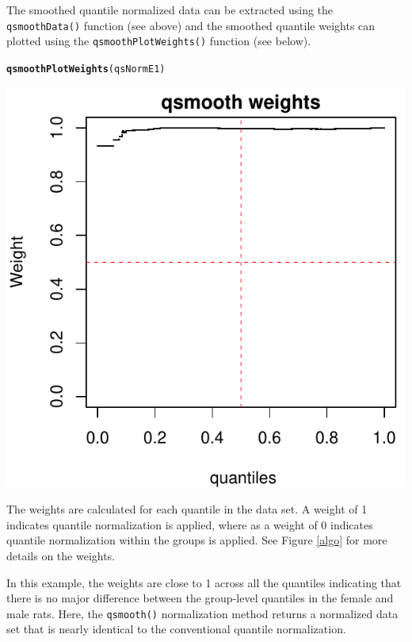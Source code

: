\documentclass{article}\usepackage[]{graphicx}\usepackage[usenames,dvipsnames]{color}
\makeatletter
\def\maxwidth{ %
  \ifdim\Gin@nat@width>\linewidth
    \linewidth
  \else
    \Gin@nat@width
  \fi
}
\newcommand{\hlstd}[1]{\textcolor[rgb]{0.345,0.345,0.345}{#1}}%
\newcommand{\hlkwd}[1]{\textcolor[rgb]{0.737,0.353,0.396}{\textbf{#1}}}%
\newenvironment{kframe}{%
 \def\at@end@of@kframe{}%
 \ifinner\ifhmode%
  \def\at@end@of@kframe{\end{minipage}}%
  \begin{minipage}{\columnwidth}%
 \fi\fi%
 \def\FrameCommand##1{\hskip\@totalleftmargin \hskip-\fboxsep
 \colorbox{shadecolor}{##1}\hskip-\fboxsep
     \hskip-\linewidth \hskip-\@totalleftmargin \hskip\columnwidth}%
 \MakeFramed {\advance\hsize-\width
   \@totalleftmargin\z@ \linewidth\hsize
   \@setminipage}}%
 {\par\unskip\endMakeFramed%
 \at@end@of@kframe}
\newenvironment{knitrout}{}{} %
\makeatother
\begin{document}
The smoothed quantile normalized data can be extracted using the 
\texttt{qsmoothData()} function (see above) and the smoothed quantile weights 
can plotted using the \texttt{qsmoothPlotWeights()} function (see below). 

\begin{knitrout}
\color{fgcolor}\begin{kframe}
\begin{alltt}
\hlkwd{qsmoothPlotWeights}\hlstd{(qsNormE1)}
\end{alltt}
\end{kframe}
\includegraphics[width=\maxwidth]{figure/plot-qsmooth1-weights-1} 

\end{knitrout}

The weights are calculated for each quantile in the data set.
A weight of 1 indicates quantile normalization is applied,
where as a weight of 0 indicates quantile normalization
within the groups is applied. See Figure \ref{algo} for 
more details on the weights.

In this example, the weights are close to 1 across all the 
quantiles indicating that there is no major difference 
between the group-level quantiles in the female and male rats. 
Here, the \texttt{qsmooth()} normalization method returns a 
normalized data set that is nearly identical
to the conventional quantile normalization. 
\end{document}
